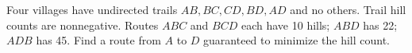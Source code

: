 Four villages have undirected trails $AB,BC,CD,BD,AD$ and no others. Trail hill counts are nonnegative. Routes $ABC$ and $BCD$ each have 10 hills; $ABD$ has 22; $ADB$ has 45. Find a route from $A$ to $D$ guaranteed to minimize the hill count.

